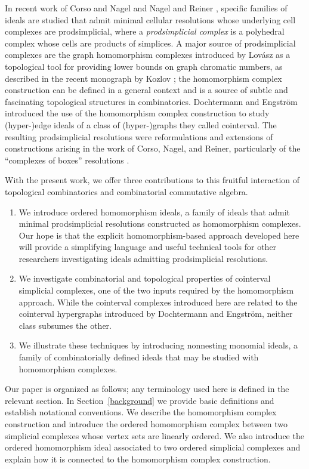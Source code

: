 \documentclass[11pt]{amsart}
\theoremstyle{definition}
\numberwithin{equation}{section}
\theoremstyle{remark}
\numberwithin{equation}{section}
\begin{document}
In recent work of Corso and Nagel \cite{CorsoNagel1,CorsoNagel2} and Nagel and Reiner \cite{NagelReiner}, specific families of ideals are studied that admit minimal cellular resolutions whose underlying cell complexes are prodsimplicial, where a \emph{prodsimplicial complex} is a polyhedral complex whose cells are products of simplices.
A major source of prodsimplicial complexes are the graph homomorphism complexes introduced by Lov\'{a}sz as a topological tool for providing lower bounds on graph chromatic numbers, as described in the recent monograph by Kozlov \cite{KozlovBook}; the homomorphism complex construction can be defined in a general context and is a source of subtle and fascinating topological structures in combinatorics.
Dochtermann and Engstr\"{o}m \cite{DochtermannEngstromCellular} introduced the use of the homomorphism complex construction to study (hyper-)edge ideals of a class of (hyper-)graphs they called cointerval.
The resulting prodsimplicial resolutions were reformulations and extensions of constructions arising in the work of Corso, Nagel, and Reiner, particularly of the ``complexes of boxes'' resolutions \cite[Section 3.3]{NagelReiner}.

With the present work, we offer three contributions to this fruitful interaction of topological combinatorics and combinatorial commutative algebra.
\begin{enumerate}
\item We introduce ordered homomorphism ideals, a family of ideals that admit minimal prodsimplicial resolutions constructed as homomorphism complexes.
Our hope is that the explicit homomorphism-based approach developed here will provide a simplifying language and useful technical tools for other researchers investigating ideals admitting prodsimplicial resolutions.
\item We investigate combinatorial and topological properties of cointerval simplicial complexes, one of the two inputs required by the homomorphism approach.
While the cointerval complexes introduced here are related to the cointerval hypergraphs introduced by Dochtermann and Engstr\"{o}m, neither class subsumes the other.
\item We illustrate these techniques by introducing nonnesting monomial ideals, a family of combinatorially defined ideals that may be studied with homomorphism complexes.
\end{enumerate}

Our paper is organized as follows; any terminology used here is defined in the relevant section.
In Section~\ref{background} we provide basic definitions and establish notational conventions.  
We describe the homomorphism complex construction and introduce the ordered homomorphism complex between two simplicial complexes whose vertex sets are linearly ordered. 
We also introduce the ordered homomorphism ideal associated to two ordered simplicial complexes and explain how it is connected to the homomorphism complex construction.
\end{document}
